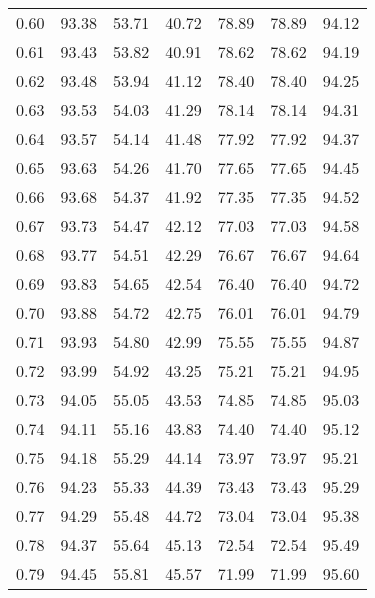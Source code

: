 \begin{tabular}{|c|c|c|c|c|c|c|}
      0.60 &     93.38 &     53.71 &      40.72 &   78.89 &      78.89 &         94.12 \\
      0.61 &     93.43 &     53.82 &      40.91 &   78.62 &      78.62 &         94.19 \\
      0.62 &     93.48 &     53.94 &      41.12 &   78.40 &      78.40 &         94.25 \\
      0.63 &     93.53 &     54.03 &      41.29 &   78.14 &      78.14 &         94.31 \\
      0.64 &     93.57 &     54.14 &      41.48 &   77.92 &      77.92 &         94.37 \\
      0.65 &     93.63 &     54.26 &      41.70 &   77.65 &      77.65 &         94.45 \\
      0.66 &     93.68 &     54.37 &      41.92 &   77.35 &      77.35 &         94.52 \\
      0.67 &     93.73 &     54.47 &      42.12 &   77.03 &      77.03 &         94.58 \\
      0.68 &     93.77 &     54.51 &      42.29 &   76.67 &      76.67 &         94.64 \\
      0.69 &     93.83 &     54.65 &      42.54 &   76.40 &      76.40 &         94.72 \\
      0.70 &     93.88 &     54.72 &      42.75 &   76.01 &      76.01 &         94.79 \\
      0.71 &     93.93 &     54.80 &      42.99 &   75.55 &      75.55 &         94.87 \\
      0.72 &     93.99 &     54.92 &      43.25 &   75.21 &      75.21 &         94.95 \\
      0.73 &     94.05 &     55.05 &      43.53 &   74.85 &      74.85 &         95.03 \\
      0.74 &     94.11 &     55.16 &      43.83 &   74.40 &      74.40 &         95.12 \\
      0.75 &     94.18 &     55.29 &      44.14 &   73.97 &      73.97 &         95.21 \\
      0.76 &     94.23 &     55.33 &      44.39 &   73.43 &      73.43 &         95.29 \\
      0.77 &     94.29 &     55.48 &      44.72 &   73.04 &      73.04 &         95.38 \\
      0.78 &     94.37 &     55.64 &      45.13 &   72.54 &      72.54 &         95.49 \\
      0.79 &     94.45 &     55.81 &      45.57 &   71.99 &      71.99 &         95.60 \\

\end{tabular}
